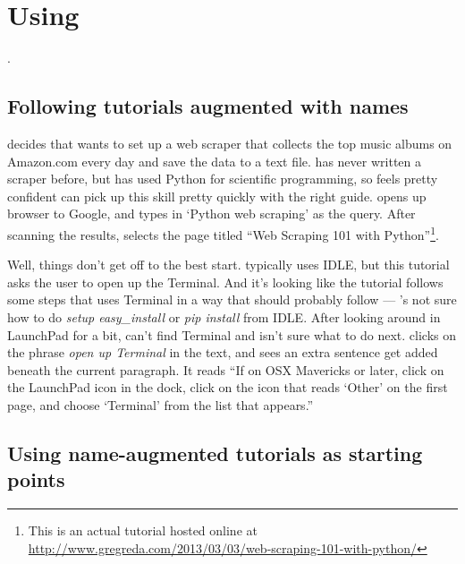 \section{Using \systemname{}}

.

\subsection{Following tutorials augmented with \glspl{name}}

\user{} decides that \userpro{} wants to set up a web scraper that collects the top music albums on Amazon.com every day and save the data to a text file.
\userpro{} has never written a scraper before, but has used Python for scientific programming, so \userpro{} feels pretty confident \userpro{} can pick up this skill pretty quickly with the right guide.
\userpro{} opens up \userpos{} browser to Google, and types in `Python web scraping' as the query.
After scanning the results, \userpro{} selects the page titled ``Web Scraping 101 with Python''\footnote
{This is an actual tutorial hosted online at \url{http://www.gregreda.com/2013/03/03/web-scraping-101-with-python/}}.

Well, things don't get off to the best start.
\user{} typically uses IDLE, but this tutorial asks the user to open up the Terminal.
And it's looking like the tutorial follows some steps that uses Terminal in a way that \userpro{} should probably follow --- \userpro{}'s not sure how to do \emph{setup easy\_install} or \emph{pip install} from IDLE.
After looking around in LaunchPad for a bit, \userpro{} can't find Terminal and isn't sure what to do next.
\userpro{} clicks on the phrase \emph{open up Terminal} in the text, and sees an extra sentence get added beneath the current paragraph.
It reads ``If on OSX Mavericks or later, click on the LaunchPad icon in the dock, click on the icon that reads `Other' on the first page, and choose `Terminal' from the list that appears.''


\subsection{Using \gls{name}-augmented tutorials as starting points}

